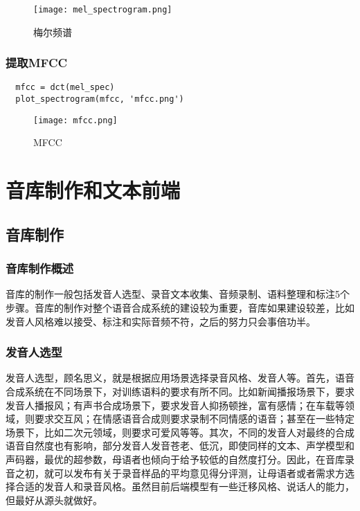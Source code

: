 \documentclass[cn,10pt,math=newtx,citestyle=gb7714-2015,bibstyle=gb7714-2015]{elegantbook}
\begin{document}
\begin{figure}[htbp]
  \centering
  \texttt{[image: mel\_spectrogram.png]}
  \caption{梅尔频谱 \label{fig:mel_spectrogram}}
\end{figure}

\subsection{提取MFCC}

\begin{lstlisting}
  mfcc = dct(mel_spec)
  plot_spectrogram(mfcc, 'mfcc.png')
\end{lstlisting}

\begin{figure}[htbp]
  \centering
  \texttt{[image: mfcc.png]}
  \caption{MFCC \label{fig:mfcc}}
\end{figure}



\chapter{音库制作和文本前端}

\section{音库制作}

\subsection{音库制作概述}

音库的制作一般包括发音人选型、录音文本收集、音频录制、语料整理和标注5个步骤。音库的制作对整个语音合成系统的建设较为重要，音库如果建设较差，比如发音人风格难以接受、标注和实际音频不符，之后的努力只会事倍功半。

\subsection{发音人选型}

发音人选型，顾名思义，就是根据应用场景选择录音风格、发音人等。首先，语音合成系统在不同场景下，对训练语料的要求有所不同。比如新闻播报场景下，要求发音人播报风；有声书合成场景下，要求发音人抑扬顿挫，富有感情；在车载等领域，则要求交互风；在情感语音合成则要求录制不同情感的语音；甚至在一些特定场景下，比如二次元领域，则要求可爱风等等。其次，不同的发音人对最终的合成语音自然度也有影响，部分发音人发音苍老、低沉，即使同样的文本、声学模型和声码器，最优的超参数，母语者也倾向于给予较低的自然度打分。因此，在音库录音之初，就可以发布有关于录音样品的平均意见得分评测，让母语者或者需求方选择合适的发音人和录音风格。虽然目前后端模型有一些迁移风格、说话人的能力，但最好从源头就做好。
\end{document}
